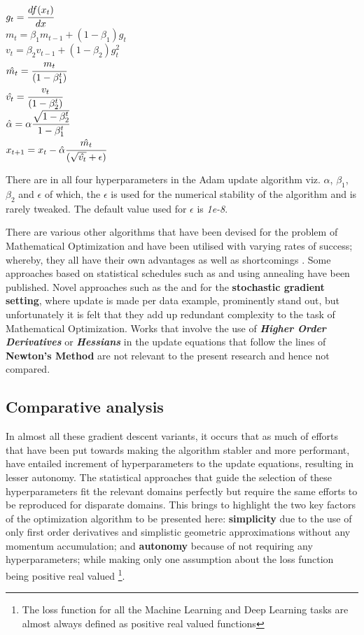 \documentclass{article}
\begin{document}
\begin{center}
	$g_t = \cfrac{d f(x_t)}{dx}$ \\
	$m_t = \beta_1 m_{t-1} + (1 - \beta_1) g_t$ \\
	$v_t = \beta_2 v_{t-1} + (1 - \beta_2) g_t^2$ \\
	$\hat{m_t} = \cfrac{m_t}{(1 - \beta_1^t)}$ \\
	$\hat{v_t} = \cfrac{v_t}{(1 - \beta_2^t)}$ \\
	$\hat{\alpha} = \alpha \cfrac{\sqrt{1 - \beta_2^t}}{1 - \beta_1^t}$ \\
	$x_{t + 1} = x_{t} - \hat{\alpha} \cfrac{\hat{m_t}}{(\sqrt{\hat{v_t}} + \epsilon)}$\\
\end{center}

There are in all four hyperparameters in the Adam update algorithm viz. $\alpha$, $\beta_1$, $\beta_2$ and $\epsilon$ of which, the $\epsilon$ is used for the numerical stability of the algorithm and is rarely tweaked. The default value used for $\epsilon$ is \textit{1e-8}.


There are various other algorithms that have been devised for the problem of Mathematical Optimization and have been utilised with varying rates of success; whereby, they all have their own advantages as well as shortcomings \cite{rudder:overview}. Some approaches based on statistical schedules such as \cite{darken:schedule} and using annealing \cite{robbins:annealing} have been published. Novel approaches such as the \cite{koolen:learning-learning-rate} and \cite{schaul:pesky} for the \textbf{stochastic gradient setting}, where update is made per data example, prominently stand out, but unfortunately it is felt that they add up redundant complexity to the task of Mathematical Optimization. Works that involve the use of \textit{\textbf{Higher Order Derivatives}} or \textit{\textbf{Hessians}} in the update equations that follow the lines of \textbf{Newton's Method} are not relevant to the present research and hence not compared.

\subsection{Comparative analysis}
In almost all these gradient descent variants, it occurs that as much of efforts that have been put towards making the algorithm stabler and more performant, have entailed increment of hyperparameters to the update equations, resulting in lesser autonomy. The statistical approaches that guide the selection of these hyperparameters fit the relevant domains perfectly but require the same efforts to be reproduced for disparate domains. This brings to highlight the two key factors of the optimization algorithm to be presented here: \textbf{simplicity} due to the use of only first order derivatives and simplistic geometric approximations without any momentum accumulation; and \textbf{autonomy} because of not requiring any hyperparameters; while making only one assumption about the loss function being positive real valued \footnote{The loss function for all the Machine Learning and Deep Learning tasks are almost always defined as positive real valued functions}.
\end{document}
